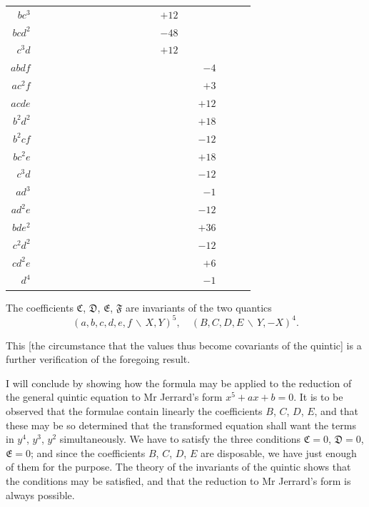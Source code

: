 \documentclass[11pt,a4paper]{article}
\theoremstyle{definition}
\begin{document}
\begin{center}
\begin{tabular}{r|rrrrrrrrrrrrrrrrrr}
$bc^{3}$ & & & & & & & & & & & & & $+12$ \\
$bcd^{2}$ & & & & & & & & & & & & & $-48$ \\
$c^{3}d$ & & & & & & & & & & & & & $+12$ \\
$abdf$ & & & & & & & & & & & & & & & $-4$ \\
$ac^{2}f$ & & & & & & & & & & & & & & & $+3$ \\
$acde$ & & & & & & & & & & & & & & & $+12$ \\
$b^{2}d^{2}$ & & & & & & & & & & & & & & & $+18$ \\
$b^{2}cf$ & & & & & & & & & & & & & & & $-12$ \\
$bc^{2}e$ & & & & & & & & & & & & & & & $+18$ \\
$c^{3}d$ & & & & & & & & & & & & & & & $-12$ \\
$ad^{3}$ & & & & & & & & & & & & & & & $-1$ \\
$ad^{2}e$ & & & & & & & & & & & & & & & $-12$ \\
$bde^{2}$ & & & & & & & & & & & & & & & $+36$ \\
$c^{2}d^{2}$ & & & & & & & & & & & & & & & $-12$ \\
$cd^{2}e$ & & & & & & & & & & & & & & & $+6$ \\
$d^{4}$ & & & & & & & & & & & & & & & $-1$
\end{tabular}
\normalsize
\end{center}

The coefficients $\mathfrak{C}$, $\mathfrak{D}$, $\mathfrak{E}$, $\mathfrak{F}$ are invariants
of the two quantics
\[(a,b,c,d,e,f\,\backslash\!\!\,X,Y)^{5}, \quad (B,C,D,E\,\backslash\!\!\,Y,-X)^{4}.\]

This [the circumstance that the values thus become covariants of the quintic] is a
further verification of the foregoing result.

I will conclude by showing how the formula may be applied to the reduction of the
general quintic equation to Mr Jerrard's form $x^{5}+ax+b=0$. It is to be observed that
the formulae contain linearly the coefficients $B$, $C$, $D$, $E$, and that these may be
so determined that the transformed equation shall want the terms in $y^{4}$, $y^{3}$, $y^{2}$
simultaneously. We have to satisfy the three conditions $\mathfrak{C}=0$, $\mathfrak{D}=0$,
$\mathfrak{E}=0$; and since the coefficients $B$, $C$, $D$, $E$ are disposable, we have
just enough of them for the purpose. The theory of the invariants of the quintic shows
that the conditions may be satisfied, and that the reduction to Mr Jerrard's form is
always possible.
\end{document}
